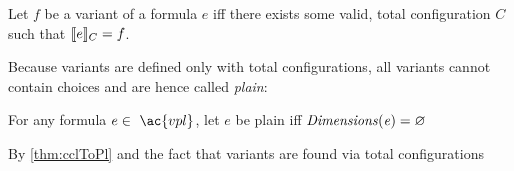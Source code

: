 \begin{definition}[Variant]
  Let $f$ be a variant of a formula $e$ iff there exists some
  valid, total configuration $C$ such that $\sem[C]{e} = f$.
\end{definition}

Because variants are defined only with total configurations, all variants cannot
contain choices and are hence called \textit{plain}:

\begin{definition}
  For any formula $e \in\ \ac{vpl}$, let $e$ be plain iff $\mathit{Dimensions(e)}
  = \varnothing$
\end{definition}
%
\begin{lemma}
  By \autoref{thm:cclToPl} and the fact that variants are found via total
  configurations
\end{lemma}
%
%

